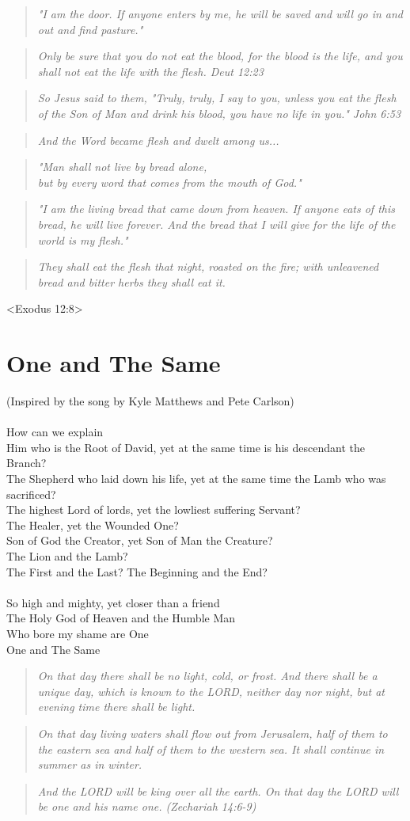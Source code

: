 \documentclass[10pt,oneside,footinclude=true,headinclude=true]{scrbook} %
\newcommand\quot[1]{
	\begin{quote}\textit{\small#1}\end{quote}
}
\begin{document}
\quot{"I am the door. If anyone enters by me, he will be saved and will go in and out and find pasture."}

\quot{Only be sure that you do not eat the blood, for the blood is the life, and you shall not eat the life with the flesh. Deut 12:23}

\quot{So Jesus said to them, "Truly, truly, I say to you, unless you eat the flesh of the Son of Man and drink his blood, you have no life in you." John 6:53}

\quot{And the Word became flesh and dwelt among us...}

\quot{"Man shall not live by bread alone,\\
\hspace*{5mm}but by every word that comes from the mouth of God."}

\quot{"I am the living bread that came down from heaven. If anyone eats of this bread, he will live forever. And the bread that I will give for the life of the world is my flesh."}

\quot{They shall eat the flesh that night, roasted on the fire; with unleavened bread and bitter herbs they shall eat it.}
<Exodus 12:8>


\chapter{One and The Same}
(Inspired by the song by Kyle Matthews and Pete Carlson)\\
\\
How can we explain\\
Him who is the Root of David, yet at the same time is his descendant the Branch?\\
The Shepherd who laid down his life, yet at the same time the Lamb who was sacrificed?\\
The highest Lord of lords, yet the lowliest suffering Servant?\\
The Healer, yet the Wounded One?\\
Son of God the Creator, yet Son of Man the Creature?\\
The Lion and the Lamb?\\
The First and the Last? The Beginning and the End?\\
\\
So high and mighty, yet closer than a friend\\
The Holy God of Heaven and the Humble Man\\
Who bore my shame are One\\
One and The Same\\

\quot{On that day there shall be no light, cold, or frost. And there shall be a unique day, which is known to the LORD, neither day nor night, but at evening time there shall be light.}

\quot{On that day living waters shall flow out from Jerusalem, half of them to the eastern sea and half of them to the western sea. It shall continue in summer as in winter.}

\quot{And the LORD will be king over all the earth. On that day the LORD will be one and his name one. (Zechariah 14:6-9)}
\end{document}
